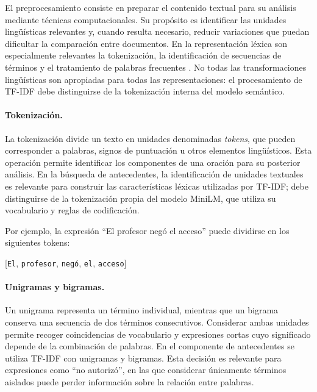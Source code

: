 El preprocesamiento consiste en preparar el contenido textual para su análisis mediante técnicas computacionales. Su propósito es identificar las unidades lingüísticas relevantes y, cuando resulta necesario, reducir variaciones que puedan dificultar la comparación entre documentos. En la representación léxica son especialmente relevantes la tokenización, la identificación de secuencias de términos y el tratamiento de palabras frecuentes \cite{jurafsky2023slp}. No todas las transformaciones lingüísticas son apropiadas para todas las representaciones: el procesamiento de TF-IDF debe distinguirse de la tokenización interna del modelo semántico.

\paragraph{Tokenización.}

La tokenización divide un texto en unidades denominadas \textit{tokens}, que pueden corresponder a palabras, signos de puntuación u otros elementos lingüísticos. Esta operación permite identificar los componentes de una oración para su posterior análisis. En la búsqueda de antecedentes, la identificación de unidades textuales es relevante para construir las características léxicas utilizadas por TF-IDF; debe distinguirse de la tokenización propia del modelo MiniLM, que utiliza su vocabulario y reglas de codificación.

Por ejemplo, la expresión ``El profesor negó el acceso'' puede dividirse en los siguientes tokens:

\begin{center}
    [\texttt{El}, \texttt{profesor}, \texttt{negó},
    \texttt{el}, \texttt{acceso}]
\end{center}

\paragraph{Unigramas y bigramas.}

Un unigrama representa un término individual, mientras que un bigrama conserva una secuencia de dos términos consecutivos. Considerar ambas unidades permite recoger coincidencias de vocabulario y expresiones cortas cuyo significado depende de la combinación de palabras. En el componente de antecedentes se utiliza TF-IDF con unigramas y bigramas. Esta decisión es relevante para expresiones como ``no autorizó'', en las que considerar únicamente términos aislados puede perder información sobre la relación entre palabras.


